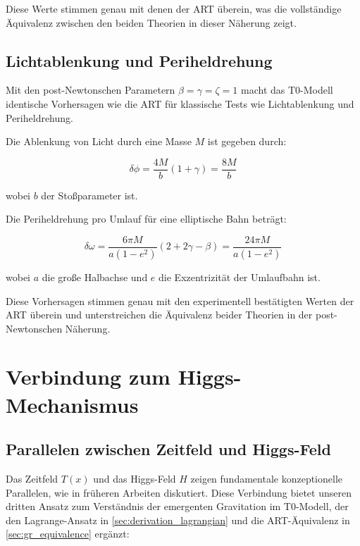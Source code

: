 \documentclass[12pt,a4paper]{article}
\newcommand{\Tfield}{T(x)}
\begin{document}
	Diese Werte stimmen genau mit denen der ART überein, was die vollständige Äquivalenz zwischen den beiden Theorien in dieser Näherung zeigt.
	
	\subsection{Lichtablenkung und Periheldrehung}
	Mit den post-Newtonschen Parametern \(\beta = \gamma = \zeta = 1\) macht das T0-Modell identische Vorhersagen wie die ART für klassische Tests wie Lichtablenkung und Periheldrehung.
	
	Die Ablenkung von Licht durch eine Masse \(M\) ist gegeben durch:
	
	\begin{equation}
		\delta\phi = \frac{4M}{b}(1 + \gamma) = \frac{8M}{b}
	\end{equation}
	
	wobei \(b\) der Stoßparameter ist.
	
	Die Periheldrehung pro Umlauf für eine elliptische Bahn beträgt:
	
	\begin{equation}
		\delta\omega = \frac{6\pi M}{a(1-e^2)}(2 + 2\gamma - \beta) = \frac{24\pi M}{a(1-e^2)}
	\end{equation}
	
	wobei \(a\) die große Halbachse und \(e\) die Exzentrizität der Umlaufbahn ist.
	
	Diese Vorhersagen stimmen genau mit den experimentell bestätigten Werten der ART überein und unterstreichen die Äquivalenz beider Theorien in der post-Newtonschen Näherung.
	
	\section{Verbindung zum Higgs-Mechanismus}
	\label{sec:higgs_connection}
	
	\subsection{Parallelen zwischen Zeitfeld und Higgs-Feld}
	\label{subsec:higgs_parallels}
	Das Zeitfeld \(\Tfield\) und das Higgs-Feld \(H\) zeigen fundamentale konzeptionelle Parallelen, wie in früheren Arbeiten \cite{pascher_higgs_2025,pascher_alpha_2025,pascher_alphabeta_2025} diskutiert. Diese Verbindung bietet unseren dritten Ansatz zum Verständnis der emergenten Gravitation im T0-Modell, der den Lagrange-Ansatz in \cref{sec:derivation_lagrangian} und die ART-Äquivalenz in \cref{sec:gr_equivalence} ergänzt:
	
\end{document}
